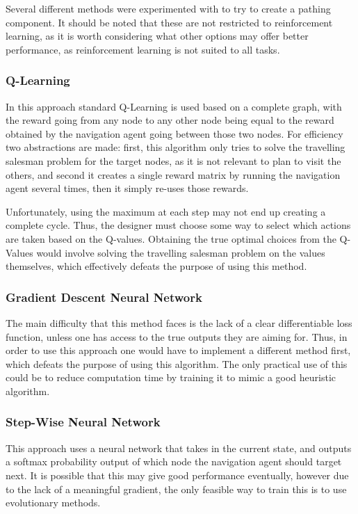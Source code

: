 \documentclass{article}
\begin{document}
    Several different methods were experimented with to try to create a pathing component. It should be noted that these are not restricted to reinforcement learning, as it is worth considering what other options may offer better performance, as reinforcement learning is not suited to all tasks.
    
    \subsubsection{Q-Learning}
    In this approach standard Q-Learning is used based on a complete graph, with the reward going from any node to any other node being equal to the reward obtained by the navigation agent going between those two nodes. For efficiency two abstractions are made: first, this algorithm only tries to solve the travelling salesman problem for the target nodes, as it is not relevant to plan to visit the others, and second it creates a single reward matrix by running the navigation agent several times, then it simply re-uses those rewards.
    
    Unfortunately, using the maximum at each step may not end up creating a complete cycle. Thus, the designer must choose some way to select which actions are taken based on the Q-values. Obtaining the true optimal choices from the Q-Values would involve solving the travelling salesman problem on the values themselves, which effectively defeats the purpose of using this method.
    
    \subsubsection{Gradient Descent Neural Network}
    The main difficulty that this method faces is the lack of a clear differentiable loss function, unless one has access to the true outputs they are aiming for. Thus, in order to use this approach one would have to implement a different method first, which defeats the purpose of using this algorithm. The only practical use of this could be to reduce computation time by training it to mimic a good heuristic algorithm.
    
    \subsubsection{Step-Wise Neural Network}
    This approach uses a neural network that takes in the current state, and outputs a softmax probability output of which node the navigation agent should target next. It is possible that this may give good performance eventually, however due to the lack of a meaningful gradient, the only feasible way to train this is to use evolutionary methods.
    
\end{document}
